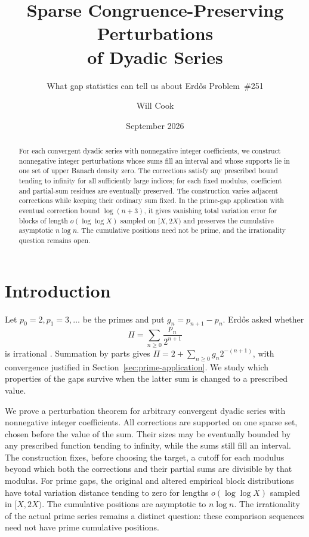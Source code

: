 \documentclass[11pt]{article}
\title{Sparse Congruence-Preserving Perturbations\\of Dyadic Series}
\subtitle{What gap statistics can tell us about Erd\H{o}s Problem~\#251}
\author{Will Cook}
\date{September 2026}
\begin{document}
\maketitle
\noteprovenance

\begin{abstract}
For each convergent dyadic series with nonnegative integer coefficients,
we construct nonnegative integer perturbations whose sums fill an interval
and whose supports lie in one set of upper Banach density zero.
The corrections satisfy any prescribed bound tending to infinity for all
sufficiently large indices; for each fixed modulus, coefficient and partial-sum
residues are eventually preserved.  The construction varies adjacent corrections
while keeping their ordinary sum fixed.  In the prime-gap application with
eventual correction bound $\log(n+3)$, it gives vanishing total variation error for
blocks of length $o(\log\log X)$ sampled on $[X,2X)$ and preserves the
cumulative asymptotic $n\log n$.  The cumulative positions need not be prime, and the
irrationality question remains open.
\end{abstract}

\section{Introduction}\label{sec:problem}
Let $p_0=2,p_1=3,\ldots$ be the primes and put $g_n=p_{n+1}-p_n$.
Erd\H{o}s asked whether
\[
 \Pi=\sum_{n\ge0}\frac{p_n}{2^{n+1}}
\]
is irrational \cite[p.~94]{erdos1958}\cite[p.~62]{erdosgraham1980}
\cite[p.~103]{erdos1988}.  Summation by parts gives
$\Pi=2+\sum_{n\ge0}g_n2^{-(n+1)}$, with convergence justified in
Section~\ref{sec:prime-application}.  We study which properties of the gaps survive
when the latter sum is changed to a prescribed value.

We prove a perturbation theorem for arbitrary convergent dyadic series
with nonnegative integer coefficients.  All corrections are supported on
one sparse set, chosen before the value of the sum.  Their sizes may be
eventually bounded by any prescribed function tending to infinity, while the sums
still fill an interval.  The construction fixes, before choosing the target,
a cutoff for each modulus beyond which both the corrections and their
partial sums are divisible by that modulus.  For prime gaps, the original
and altered empirical block distributions have total variation distance
tending to zero for lengths $o(\log\log X)$ sampled in $[X,2X)$.
The cumulative positions are asymptotic to $n\log n$.  The irrationality of the actual prime series
remains a distinct question: these comparison sequences need not have
prime cumulative positions.
\end{document}
